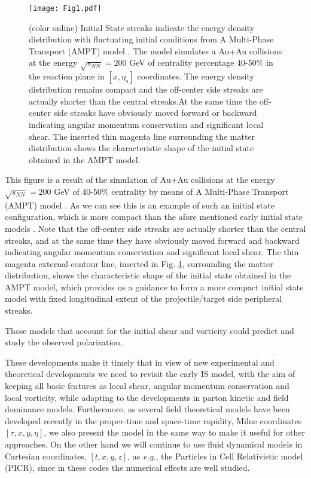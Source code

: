 \documentclass[aps,prc,twocolumn,floatfix,showpacs,a4paper,
nofootinbib,amsmath,amssymb]{revtex4-1}
\begin{document}
%
\begin{figure}[ht]     %
\begin{center}
\resizebox{0.98\columnwidth}{!}
{\texttt{[image: Fig1.pdf]}}
\caption{ (color online)
Initial State streaks indicate the energy density distribution with
fluctuating initial conditions from A Multi-Phase Transport (AMPT) 
model \cite{Fig.1}. The model simulates a
 Au+Au collisions at  the energy $\sqrt{s_{NN}}=200 $ GeV of centrality percentage 40-50\% in the reaction plane in $[x,\eta_s]$ coordinates. The energy density distribution remains compact and the off-center side streaks are actually shorter than the central streaks.At the same time the off-center side streaks have obviously moved forward or backward indicating angular momentum conservation and significant local shear. The inserted thin magenta line surrounding the matter distribution shows the characteristic shape of the initial state obtained in the AMPT model.}
\label{Streaks}
\end{center}
\end{figure}        %

This figure is a result of the simulation of Au+Au collisions at  the energy $\sqrt{s_{NN}}=200 $ GeV of 40-50\% centrality  by means of A Multi-Phase Transport (AMPT) model \cite{Fig.1}.  As we can see this is an example of such an initial state configuration,  which is more compact than the afore mentioned early initial  state models \cite{M2001,M2002}. 
Note that the off-center side streaks are actually shorter than the central streaks, and at the same time they have obviously moved forward and backward indicating angular momentum conservation and significant local shear. The thin magenta  external contour line, inserted in Fig. \ref{Streaks}, surrounding the matter distribution, shows the characteristic shape of the initial state obtained in the AMPT model, which provides  us a guidance to form  a more compact initial state model   with fixed longitudinal extent of the projectile/target side   peripheral streaks. 
   
Those models that account for the initial shear and vorticity \cite{CMW13,Bec13,Erratum,WCBS14,PangEA2016} could predict  and study the observed polarization.

These developments make it timely that in view of new experimental 
and theoretical developments we need to revisit the early IS model,
with the aim of keeping all basic features as local shear, angular
momentum conservation and local vorticity, while adapting to the
developments in parton kinetic \cite{Pathia,AMPT,Deng2016} and 
field dominance \cite{Vovchenko} models. Furthermore, as 
several field theoretical models have been developed recently in the
proper-time and space-time rapidity, Milne coordinates 
$[\tau, x, y, \eta]$, we also present the model in the
same way to make it useful for other approaches. On the other
hand we will continue to use fluid dynamical models in 
Cartesian coordinates, $[t,x,y,z]$, as {\it e.g.}, the Particles in Cell Relativistic 
model (PICR), since in these codes
the numerical effects are well studied. 
\end{document}
